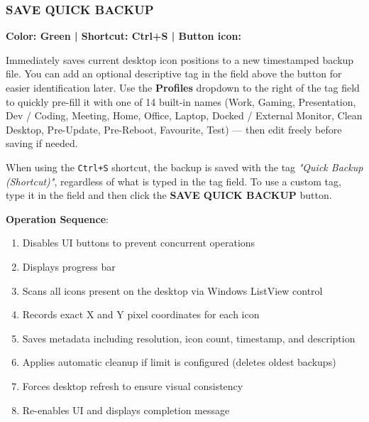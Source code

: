 \documentclass[a4paper,11pt]{article}
\begin{document}
\subsubsection{SAVE QUICK BACKUP}

\textcolor{success}{\textbf{Color: Green | Shortcut: Ctrl+S | Button
icon: \faSave}}

Immediately saves current desktop icon positions to a new timestamped
backup file. You can add an optional descriptive tag in the field
above the button for easier identification later. Use the
\textbf{Profiles} dropdown to the right of the tag field to
quickly pre-fill it with one of 14 built-in names (Work, Gaming,
  Presentation, Dev / Coding, Meeting, Home, Office, Laptop,
  Docked / External Monitor, Clean Desktop, Pre-Update, Pre-Reboot,
Favourite, Test) --- then edit freely before saving if needed.

\begin{infobox}
  When using the \texttt{Ctrl+S} shortcut, the backup is saved with
  the tag \textit{"Quick Backup (Shortcut)"}, regardless of what is
  typed in the tag field. To use a custom tag, type it in the field
  and then click the \textbf{SAVE QUICK BACKUP} button.
\end{infobox}

\textbf{Operation Sequence}:
\begin{enumerate}
  \item Disables UI buttons to prevent concurrent operations
  \item Displays progress bar
  \item Scans all icons present on the desktop via Windows ListView control
  \item Records exact X and Y pixel coordinates for each icon
  \item Saves metadata including resolution, icon count, timestamp,
    and description
  \item Applies automatic cleanup if limit is configured (deletes
    oldest backups)
  \item Forces desktop refresh to ensure visual consistency
  \item Re-enables UI and displays completion message
\end{enumerate}
\end{document}
